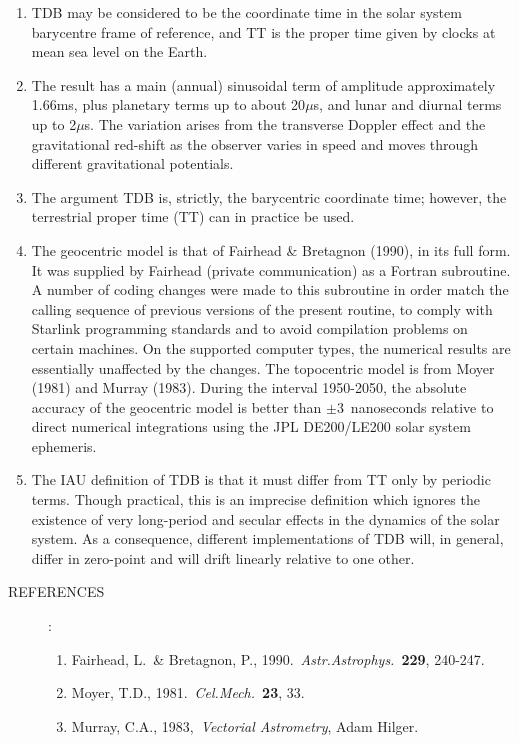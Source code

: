 \documentclass[11pt,twoside]{article}
\newlength{\oldspacing}
\newcommand{\refs}[1]
{
  \goodbreak
  \setlength{\oldspacing}{\topsep}
  \setlength{\topsep}{0.3ex}
  \begin{description}
    \item[REFERENCES]:
        #1
  \end{description}
  \setlength{\topsep}{\oldspacing}
}
\newcommand{\refs}[1]
   {
     \begin{description}
       \item[REFERENCES:]
           #1
     \end{description}
   }
\begin{document}
{
 \begin{enumerate}
  \item TDB may be considered to
        be the coordinate time in the solar system barycentre frame of
        reference, and TT is the proper time given by clocks at mean sea
        level on the Earth.
  \item The result has a main (annual) sinusoidal term of amplitude
        approximately 1.66ms, plus planetary terms up to about
        20$\mu$s, and lunar and diurnal terms up to 2$\mu$s.  The
        variation arises from the transverse Doppler effect and the
        gravitational red-shift as the observer varies in speed and
        moves through different gravitational potentials.
  \item The argument TDB is, strictly, the barycentric coordinate time;
        however, the terrestrial proper time (TT) can in practice be used.
  \item The geocentric model is that of Fairhead \& Bretagnon (1990),
        in its full
        form.  It was supplied by Fairhead (private communication)
        as a Fortran subroutine.  A number of coding changes were made to
        this subroutine in order
        match the calling sequence of previous versions of the present
        routine, to comply with Starlink programming standards and to
        avoid compilation problems on certain machines.  On the supported
        computer types,
        the numerical results are essentially unaffected by the
        changes.  The topocentric model is from Moyer (1981) and Murray (1983).
        During the interval 1950-2050, the absolute accuracy of the
        geocentric model is better than $\pm3$~nanoseconds
        relative to direct numerical integrations using the JPL DE200/LE200
        solar system ephemeris.
  \item The IAU definition of TDB is that it must differ from TT only by
        periodic terms.  Though practical, this is an imprecise definition
        which ignores the existence of very long-period and secular effects
        in the dynamics of the solar system.  As a consequence, different
        implementations of TDB will, in general, differ in zero-point and
        will drift linearly relative to one other.
 \end{enumerate}
}
\refs
{
 \begin{enumerate}
  \item Fairhead, L.\ \& 
        Bretagnon, P., 1990.\ {\it Astr.Astrophys.}\ {\bf 229}, 240-247.
  \item Moyer, T.D., 1981.\ {\it Cel.Mech.}\ {\bf 23}, 33.
  \item Murray, C.A., 1983,\ {\it Vectorial Astrometry}, Adam Hilger.
 \end{enumerate}
}
\end{document}
